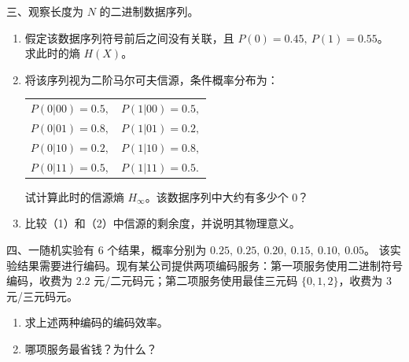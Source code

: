 \documentclass[UTF8,a4paper,12pt]{ctexart}
\begin{document}
\newpage



\vspace{1em}

\noindent
{\heiti 三、}观察长度为 $N$ 的二进制数据序列。

\vspace{0.5em}

\begin{enumerate}[label=\arabic*., leftmargin=2em, itemsep=1.0em]

\item 假定该数据序列符号前后之间没有关联，且 $P(0)=0.45,\ P(1)=0.55$。
求此时的熵 $H(X)$。

\item 将该序列视为二阶马尔可夫信源，条件概率分布为：

\begin{center}
\renewcommand{\arraystretch}{1.35}
\begin{tabular}{ll}
$P(0|00)=0.5,$ & $P(1|00)=0.5,$\\
$P(0|01)=0.8,$ & $P(1|01)=0.2,$\\
$P(0|10)=0.2,$ & $P(1|10)=0.8,$\\
$P(0|11)=0.5,$ & $P(1|11)=0.5.$
\end{tabular}
\end{center}

试计算此时的信源熵 $H_\infty$。该数据序列中大约有多少个 $0$？

\item 比较（1）和（2）中信源的剩余度，并说明其物理意义。

\end{enumerate}

\newpage


\noindent
{\heiti 四、}一随机实验有 $6$ 个结果，概率分别为
$0.25,\ 0.25,\ 0.20,\ 0.15,\ 0.10,\ 0.05$。
该实验结果需要进行编码。现有某公司提供两项编码服务：第一项服务使用二进制符号编码，收费为 $2.2$ 元/二元码元；第二项服务使用最佳三元码 $\{0,1,2\}$，收费为 $3$ 元/三元码元。

\begin{enumerate}[label=\arabic*., leftmargin=2em, itemsep=0.8em]
\item 求上述两种编码的编码效率。
\item 哪项服务最省钱？为什么？
\end{enumerate}

\newpage

\end{document}

